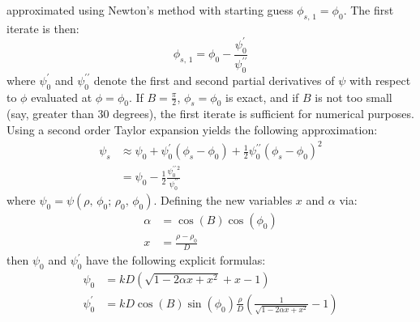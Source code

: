 \documentclass{article}
\theoremstyle{plain}
\begin{document}
        approximated using Newton's method with starting guess
        $\phi_{s,\,1}=\phi_{0}$. The first iterate is then:
        \begin{equation}
            \phi_{s,\,1}
            =\phi_{0}-\frac{\psi^{\prime}_{0}}{\psi^{\prime\prime}_{0}}
        \end{equation}
        where $\psi^{\prime}_{0}$ and $\psi^{\prime\prime}_{0}$ denote the
        first and second partial derivatives of $\psi$ with respect to $\phi$
        evaluated at $\phi=\phi_{0}$. If $B=\frac{\pi}{2}$, $\phi_{s}=\phi_{0}$
        is exact, and if $B$ is not too small (say, greater than 30 degrees),
        the first iterate is sufficient for numerical purposes. Using a
        second order Taylor expansion yields the following approximation:
        \begin{subequations}
            \begin{align}
                \psi_{s}&
                \approx\psi_{0}+\psi^{\prime}_{0}(\phi_{s}-\phi_{0})
                +\frac{1}{2}\psi^{\prime\prime}_{0}(\phi_{s}-\phi_{0})^{2}\\
                &=\psi_{0}-\frac{1}{2}
                    \frac{\psi^{\prime\prime\,2}_{0}}{\psi^{\prime\prime}_{0}}
            \end{align}
        \end{subequations}
        where $\psi_{0}=\psi(\rho,\,\phi_{0};\,\rho_{0},\,\phi_{0})$.
        Defining the new variables $x$ and $\alpha$ via:
        \begin{subequations}
            \begin{align}
                \label{eqn:alpha_and_x}
                \alpha&=\cos(B)\cos(\phi_{0})\\
                x&=\frac{\rho-\rho_{0}}{D}
            \end{align}
        \end{subequations}
        then $\psi_{0}$ and $\psi^{\prime}_{0}$ have the following explicit
        formulas:
        \begin{subequations}
            \begin{align}
                \psi_{0}
                &=kD\left(
                    \sqrt{1-2\alpha{x}+x^{2}}+x-1
                \right)\\
                \psi^{\prime}_{0}
                &=kD\cos(B)\sin(\phi_{0})\frac{\rho}{D}\left(
                    \frac{1}{\sqrt{1-2\alpha{x}+x^{2}}}-1
                \right)
            \end{align}
        \end{subequations}
\end{document}
